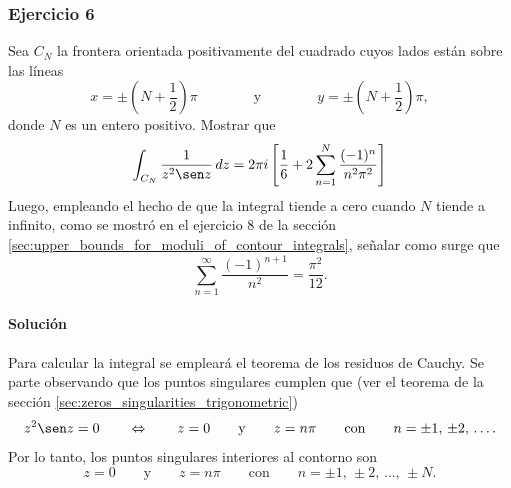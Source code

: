 \documentclass[a4paper]{report}
\begin{document}
\subsubsection{Ejercicio 6} 

Sea \(C_N\) la frontera orientada positivamente del cuadrado cuyos lados están sobre las líneas
\[
 x=\pm\left(N+\frac{1}{2}\right)\pi
 \qquad\qquad\textrm{y}\qquad\qquad
 y=\pm\left(N+\frac{1}{2}\right)\pi,
\]
donde \(N\) es un entero positivo. Mostrar que 
\[
 \int_{C_N}\frac{1}{z^2\sen z}\,dz=2\pi i\left[\frac{1}{6}+2\sum_{n=1}^N\frac{(-1)^n}{n^2\pi^2}\right]
\]
Luego, empleando el hecho de que la integral tiende a cero cuando \(N\) tiende a infinito, como se mostró en el ejercicio 8 de la sección \ref{sec:upper_bounds_for_moduli_of_contour_integrals}, señalar como surge que 
\[
 \sum_{n=1}^\infty\frac{(-1)^{n+1}}{n^2}=\frac{\pi^2}{12}.
\]

\paragraph{Solución} Para calcular la integral se empleará el teorema de los residuos de Cauchy. Se parte  observando que los puntos singulares cumplen que (ver el teorema de la sección \ref{sec:zeros_singularities_trigonometric}) 
\[
 z^2\sen z=0
 \qquad\Leftrightarrow\qquad
 z=0\qquad\textrm{y}\qquad z=n\pi
 \qquad\textrm{con}\qquad 
 n=\pm1,\,\pm2,\,\dots.
\]
Por lo tanto, los puntos singulares interiores al contorno son
\[
 z=0\qquad\textrm{y}\qquad  z=n\pi
 \qquad\textrm{con}\qquad 
 n=\pm1,\,\pm2,\,\dots,\,\pm N.
\]
\end{document}
